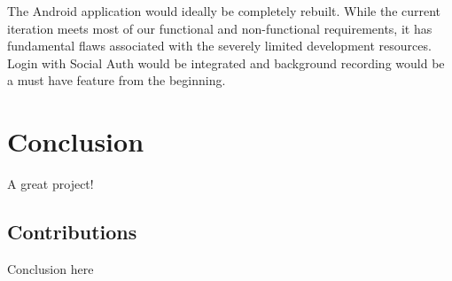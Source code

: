 \documentclass{l3proj}
\begin{document}
The Android application would ideally be completely rebuilt. While the current iteration meets most of our functional and non-functional requirements, it has fundamental flaws associated with the severely limited development resources. Login with Social Auth would be integrated and background recording would be a must have feature from the beginning.

\chapter{Conclusion}

A great project!

\section{Contributions}

Conclusion here



\printglossaries
\end{document}
